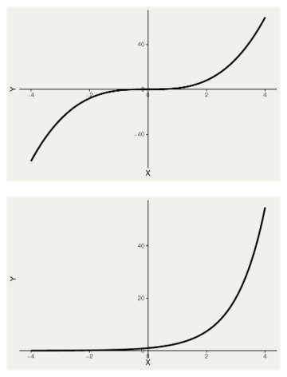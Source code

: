 \documentclass[
  letterpaper,
  DIV=11,
  numbers=noendperiod]{scrartcl}
\begin{document}
\begin{figure}
\begin{minipage}{0.33\linewidth}
\begin{figure}[H]
{\centering \includegraphics{index_files/figure-pdf/unnamed-chunk-5-2.pdf}

}


\end{figure}%

\end{minipage}%
%
\begin{minipage}{0.33\linewidth}

\begin{figure}[H]

{\centering \includegraphics{index_files/figure-pdf/unnamed-chunk-5-3.pdf}

}


\end{figure}%

\end{minipage}%
\newline
\begin{minipage}{0.33\linewidth}


\end{minipage}
\end{figure}
\end{document}
